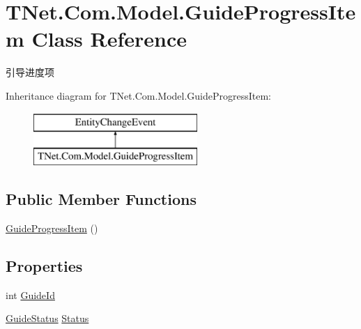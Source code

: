 \hypertarget{class_t_net_1_1_com_1_1_model_1_1_guide_progress_item}{}\section{T\+Net.\+Com.\+Model.\+Guide\+Progress\+Item Class Reference}
\label{class_t_net_1_1_com_1_1_model_1_1_guide_progress_item}


引导进度项  


Inheritance diagram for T\+Net.\+Com.\+Model.\+Guide\+Progress\+Item\+:\begin{figure}[H]
\begin{center}
\leavevmode
\includegraphics[height=2.000000cm]{class_t_net_1_1_com_1_1_model_1_1_guide_progress_item}
\end{center}
\end{figure}
\subsection*{Public Member Functions}
\begin{DoxyCompactItemize}
\item 
\mbox{\hyperlink{class_t_net_1_1_com_1_1_model_1_1_guide_progress_item_ac5b16e93028d6aab3187cd1223409003}{Guide\+Progress\+Item}} ()
\end{DoxyCompactItemize}
\subsection*{Properties}
\begin{DoxyCompactItemize}
\item 
int \mbox{\hyperlink{class_t_net_1_1_com_1_1_model_1_1_guide_progress_item_a229696d6cc3251ab9fc46c9909aa8cf8}{Guide\+Id}}
\item 
\mbox{\hyperlink{namespace_t_net_1_1_com_1_1_model_a707db44f1e497fe59e8085ae6892a50d}{Guide\+Status}} \mbox{\hyperlink{class_t_net_1_1_com_1_1_model_1_1_guide_progress_item_aa0e0c51fb001e23629a168f800706d77}{Status}}
\end{DoxyCompactItemize}


